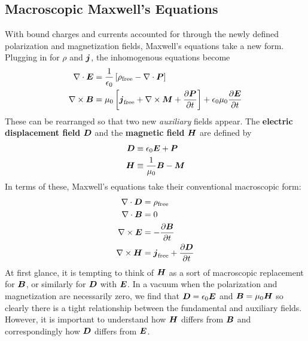\documentclass[twocolumn]{gwclass}
\begin{document}
	\subsection{Macroscopic Maxwell's Equations}
	With bound charges and currents accounted for through the newly defined polarization and magnetization fields, Maxwell's equations take a new form. Plugging in for $\rho$ and $\boldsymbol{j}$, the inhomogenous equations become
	\begin{align*}
		\nabla\cdot\boldsymbol{E} &= \frac{1}{\epsilon_0}\left[\rho_{\text{\normalfont{free}}} - \nabla\cdot\boldsymbol{P}\right] \\
		\nabla\times\boldsymbol{B} &= \mu_0\left[\boldsymbol{j}_{\text{\normalfont{free}}} + \nabla\times\boldsymbol{M} + \frac{\partial \boldsymbol{P}}{\partial t}\right] + \epsilon_0\mu_0\frac{\partial\boldsymbol{E}}{\partial t}
	\end{align*}
	These can be rearranged so that two new \emph{auxiliary} fields appear. The \textbf{electric displacement field} $\boldsymbol{D}$ and the \textbf{magnetic field} $\boldsymbol{H}$ are defined by
	\begin{align*}
		\boldsymbol{D} &\equiv \epsilon_0\boldsymbol{E} + \boldsymbol{P} \\
		\boldsymbol{H} &\equiv \frac{1}{\mu_0}\boldsymbol{B} - \boldsymbol{M}
	\end{align*}
	In terms of these, Maxwell's equations take their conventional macroscopic form:
	\begin{align*}
		\nabla\cdot \boldsymbol{D} &= \rho_{\text{\normalfont{free}}} \\
		\nabla\cdot\boldsymbol{B} &=0\\
		\nabla\times\boldsymbol{E} &=-\frac{\partial \boldsymbol{B}}{\partial t}\\
		\nabla\times\boldsymbol{H}&= \boldsymbol{j}_{\text{\normalfont{free}}} + \frac{\partial\boldsymbol{D}}{\partial t}
	\end{align*}
	At first glance, it is tempting to think of $\boldsymbol{H}$ as a sort of macroscopic replacement for $\boldsymbol{B}$, or similarly for $\boldsymbol{D}$ with $\boldsymbol{E}$. In a vacuum when the polarization and magnetization are necessarily zero, we find that $\boldsymbol{D}=\epsilon_0\boldsymbol{E}$ and $\boldsymbol{B}=\mu_0\boldsymbol{H}$ so clearly there is a tight relationship between the fundamental and auxiliary fields. However, it is important to understand how $\boldsymbol{H}$ differs from $\boldsymbol{B}$ and correspondingly how $\boldsymbol{D}$ differs from $\boldsymbol{E}$.
	
\end{document}
